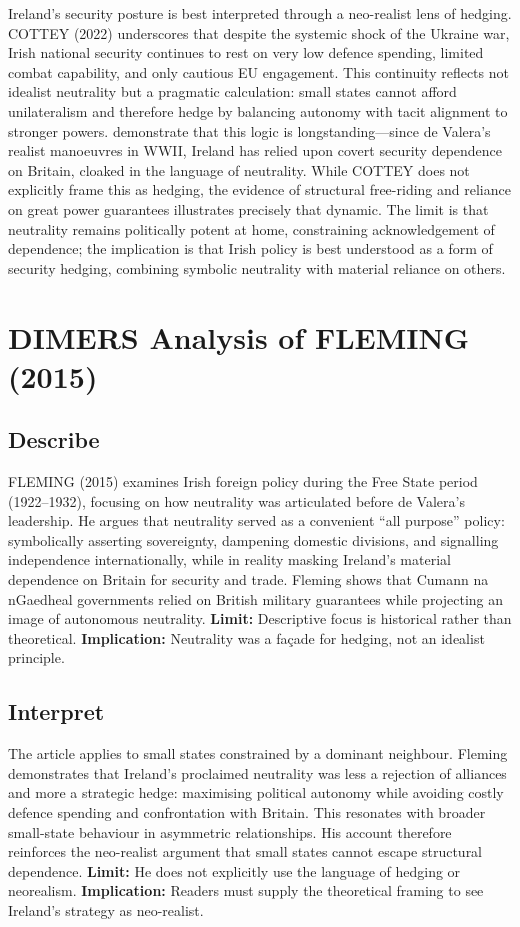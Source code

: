 \nocite{COTTEY_2022}Ireland’s security posture is best interpreted through a neo-realist lens of hedging. COTTEY (2022) underscores that despite the systemic shock of the Ukraine war, Irish national security continues to rest on very low defence spending, limited combat capability, and only cautious EU engagement. This continuity reflects not idealist neutrality but a pragmatic calculation: small states cannot afford unilateralism and therefore hedge by balancing autonomy with tacit alignment to stronger powers. \parencite{FANNING_2015,AYIOTIS_2023} demonstrate that this logic is longstanding—since de Valera’s realist manoeuvres in WWII, Ireland has relied upon covert security dependence on Britain, cloaked in the language of neutrality. While COTTEY does not explicitly frame this as hedging, the evidence of structural free-riding and reliance on great power guarantees illustrates precisely that dynamic. The limit is that neutrality remains politically potent at home, constraining acknowledgement of dependence; the implication is that Irish policy is best understood as a form of security hedging, combining symbolic neutrality with material reliance on others.

\section*{DIMERS Analysis of FLEMING (2015)}

\subsection*{Describe}
FLEMING (2015) examines Irish foreign policy during the Free State period (1922–1932), focusing on how neutrality was articulated before de Valera’s leadership. He argues that neutrality served as a convenient “all purpose” policy: symbolically asserting sovereignty, dampening domestic divisions, and signalling independence internationally, while in reality masking Ireland’s material dependence on Britain for security and trade. Fleming shows that Cumann na nGaedheal governments relied on British military guarantees while projecting an image of autonomous neutrality.  
\textbf{Limit:} Descriptive focus is historical rather than theoretical.  
\textbf{Implication:} Neutrality was a façade for hedging, not an idealist principle.

\subsection*{Interpret}
The article applies to small states constrained by a dominant neighbour. Fleming demonstrates that Ireland’s proclaimed neutrality was less a rejection of alliances and more a strategic hedge: maximising political autonomy while avoiding costly defence spending and confrontation with Britain. This resonates with broader small-state behaviour in asymmetric relationships. His account therefore reinforces the neo-realist argument that small states cannot escape structural dependence.  
\textbf{Limit:} He does not explicitly use the language of hedging or neorealism.  
\textbf{Implication:} Readers must supply the theoretical framing to see Ireland’s strategy as neo-realist.

